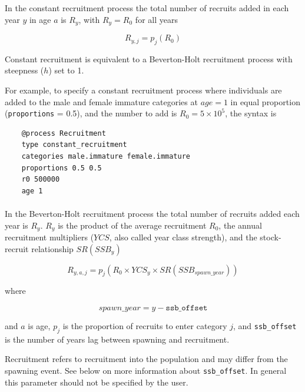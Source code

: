 In the constant recruitment process the total number of recruits added in each year $y$ in age $a$ is $R_y$, with $R_y = R_0$ for all years

\begin{equation}
  R_{y,j} = p_j(R_0)
\end{equation}

Constant recruitment is equivalent to a Beverton-Holt recruitment process with steepness ($h$) set to 1.

For example, to specify a constant recruitment process where individuals are added to the male and female immature categories at $age=1$ in equal proportion (\texttt{proportions} = 0.5), and the number to add is $R_0=5 \times 10^5$, the syntax is

{\small{\begin{verbatim}
	@process Recruitment
	type constant_recruitment
	categories male.immature female.immature
	proportions 0.5 0.5
	r0 500000
	age 1
\end{verbatim}}}

\paragraph{}\label{sec:Process-RecruitmentBevertonHolt}

In the Beverton-Holt recruitment process the total number of recruits added each year is $R_y$. $R_y$ is the product of the average recruitment $R_0$, the annual recruitment multipliers ($YCS$, also called year class strength), and the stock-recruit relationship $SR(SSB_y)$

\begin{equation}\label{eq:BH}
  R_{y,a,j} = p_j(R_0 \times YCS_{y} \times SR(SSB_{spawn\_year}))
\end{equation}

where

\begin{equation}\label{eq:year_class}
spawn\_year = y - \texttt{ssb\_offset}
\end{equation}

and $a$ is age, $p_j$ is the proportion of recruits to enter category $j$, and \texttt{ssb\_offset} is the number of years lag between spawning and recruitment.

Recruitment refers to recruitment into the population and may differ from the spawning event. See below on more information about \texttt{ssb\_offset}. In general this parameter should not be specified by the user.

